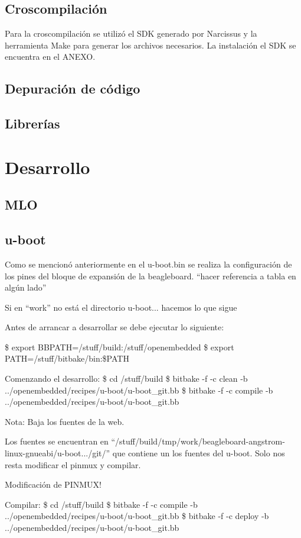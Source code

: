 \subsection{Croscompilación}
Para la croscompilación se utilizó el SDK generado por Narcissus y la herramienta Make para generar los archivos necesarios. La instalación el SDK se encuentra en el ANEXO.


\subsection{Depuración de código}
\subsection{Librerías}

\section{Desarrollo}
\subsection{MLO}
\subsection{u-boot}
Como se mencionó anteriormente en el u-boot.bin se realiza la configuración de los pines del bloque de expansión de la beagleboard. “hacer referencia a tabla en algún lado”


Si en “work” no está el directorio u-boot... hacemos lo que sigue

Antes de arrancar a desarrollar se debe ejecutar lo siguiente:

\$ export BBPATH=/stuff/build:/stuff/openembedded
\$ export PATH=/stuff/bitbake/bin:\$PATH

Comenzando el desarrollo:
\$ cd /stuff/build
\$ bitbake -f -c clean -b ../openembedded/recipes/u-boot/u-boot\_git.bb
\$ bitbake -f -c compile -b ../openembedded/recipes/u-boot/u-boot\_git.bb


Nota: Baja los fuentes de la web.

Los fuentes se encuentran en “/stuff/build/tmp/work/beagleboard-angstrom-linux-gnueabi/u-boot.../git/” que contiene un los fuentes del u-boot. Solo nos resta modificar el pinmux y compilar.

Modificación de PINMUX!


Compilar:
\$ cd /stuff/build
\$ bitbake -f -c compile -b ../openembedded/recipes/u-boot/u-boot\_git.bb
\$ bitbake -f -c deploy -b ../openembedded/recipes/u-boot/u-boot\_git.bb



